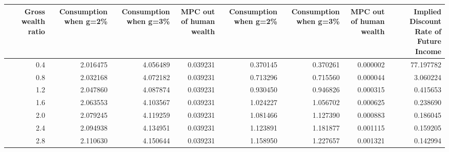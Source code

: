 \begin{tabular}{lrrrrrrrr}
\toprule
{} &  Gross wealth ratio &  Consumption when g=2\% &  Consumption when g=3\% &  MPC out of human wealth &  Consumption when g=2\% &  Consumption when g=3\% &  MPC out of human wealth &  Implied Discount Rate of Future Income \\
\midrule
{} &                 0.4 &               2.016475 &               4.056489 &                 0.039231 &               0.370145 &               0.370261 &                 0.000002 &                               77.197782 \\
{} &                 0.8 &               2.032168 &               4.072182 &                 0.039231 &               0.713296 &               0.715560 &                 0.000044 &                                3.060224 \\
{} &                 1.2 &               2.047860 &               4.087874 &                 0.039231 &               0.930450 &               0.946826 &                 0.000315 &                                0.415653 \\
{} &                 1.6 &               2.063553 &               4.103567 &                 0.039231 &               1.024227 &               1.056702 &                 0.000625 &                                0.238690 \\
{} &                 2.0 &               2.079245 &               4.119259 &                 0.039231 &               1.081466 &               1.127390 &                 0.000883 &                                0.186045 \\
{} &                 2.4 &               2.094938 &               4.134951 &                 0.039231 &               1.123891 &               1.181877 &                 0.001115 &                                0.159205 \\
{} &                 2.8 &               2.110630 &               4.150644 &                 0.039231 &               1.158950 &               1.227657 &                 0.001321 &                                0.142994 \\
\bottomrule
\end{tabular}
